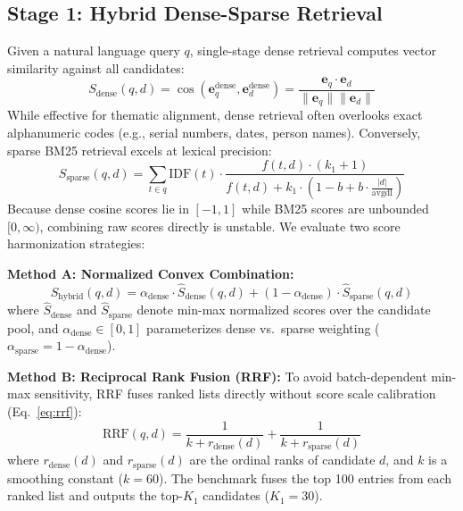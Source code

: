 \documentclass[conference]{IEEEtran}
\begin{document}
\subsection{Stage 1: Hybrid Dense-Sparse Retrieval}
Given a natural language query $q$, single-stage dense retrieval computes vector similarity against all candidates:
\begin{equation}
    S_{\text{dense}}(q, d) = \cos(\mathbf{e}_q^{\text{dense}}, \mathbf{e}_d^{\text{dense}}) = \frac{\mathbf{e}_q \cdot \mathbf{e}_d}{\|\mathbf{e}_q\| \|\mathbf{e}_d\|}
\end{equation}
While effective for thematic alignment, dense retrieval often overlooks exact alphanumeric codes (e.g., serial numbers, dates, person names). Conversely, sparse BM25 retrieval excels at lexical precision:
\begin{equation}
    S_{\text{sparse}}(q, d) = \sum_{t \in q} \text{IDF}(t) \cdot \frac{f(t, d) \cdot (k_1 + 1)}{f(t, d) + k_1 \cdot \left(1 - b + b \cdot \frac{|d|}{\text{avgdl}}\right)}
\end{equation}
Because dense cosine scores lie in $[-1, 1]$ while BM25 scores are unbounded $[0, \infty)$, combining raw scores directly is unstable. We evaluate two score harmonization strategies:

\textbf{Method A: Normalized Convex Combination:}
\begin{equation}
    S_{\text{hybrid}}(q, d) = \alpha_{\text{dense}} \cdot \hat{S}_{\text{dense}}(q, d) + (1 - \alpha_{\text{dense}}) \cdot \hat{S}_{\text{sparse}}(q, d)
    \label{eq:hybrid}
\end{equation}
where $\hat{S}_{\text{dense}}$ and $\hat{S}_{\text{sparse}}$ denote min-max normalized scores over the candidate pool, and $\alpha_{\text{dense}} \in [0, 1]$ parameterizes dense vs.\ sparse weighting ($\alpha_{\text{sparse}} = 1 - \alpha_{\text{dense}}$).

\textbf{Method B: Reciprocal Rank Fusion (RRF):}
To avoid batch-dependent min-max sensitivity, RRF \cite{cormack2009rrf} fuses ranked lists directly without score scale calibration (Eq.~\ref{eq:rrf}):
\begin{equation}
    \text{RRF}(q, d) = \frac{1}{k + r_{\text{dense}}(d)} + \frac{1}{k + r_{\text{sparse}}(d)}
    \label{eq:rrf}
\end{equation}
where $r_{\text{dense}}(d)$ and $r_{\text{sparse}}(d)$ are the ordinal ranks of candidate $d$, and $k$ is a smoothing constant ($k = 60$). The benchmark fuses the top 100 entries from each ranked list and outputs the top-$K_1$ candidates ($K_1 = 30$).
\end{document}

